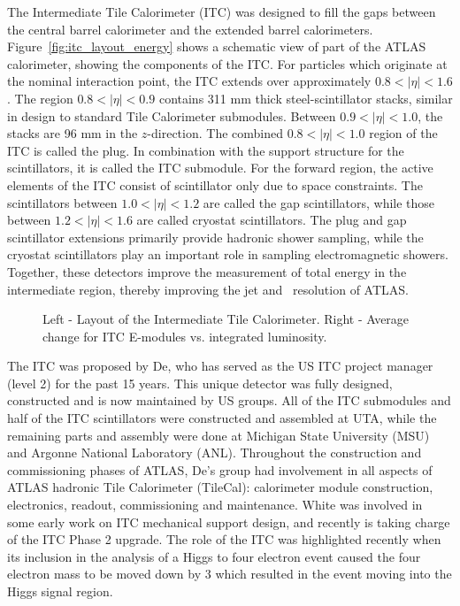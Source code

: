 
The Intermediate Tile Calorimeter (ITC) was designed to fill the
gaps between the central barrel calorimeter and the extended
barrel calorimeters. Figure~\ref{fig:itc_layout_energy} shows a schematic
view of part of the ATLAS calorimeter, showing the
components of the ITC. For particles which originate at the
nominal interaction point, the ITC extends over approximately $0.8
< |\eta| < 1.6$. The region $0.8 < |\eta| < 0.9$ contains 311 mm
thick steel-scintillator stacks, similar in design to standard
Tile Calorimeter submodules. Between $0.9 < |\eta| < 1.0$, the
stacks are 96 mm in the $z$-direction. The combined $0.8 < |\eta|
< 1.0$ region of the ITC is called the plug. In combination with
the support structure for the scintillators, it is called the ITC
submodule. For the forward region, the active elements of the ITC
consist of scintillator only due to space constraints. The
scintillators between $1.0 < |\eta| < 1.2$ are called the gap
scintillators, while those between $1.2 < |\eta| < 1.6$ are called
cryostat scintillators. The plug and gap scintillator extensions
primarily provide hadronic shower sampling, while the cryostat
scintillators play an important role in sampling electromagnetic
showers. Together, these detectors improve the measurement of
total energy in the intermediate region, thereby improving the jet
and \met\ resolution of ATLAS.

\begin{figure}[htb]
\centering
{}
\quad
{}

\caption{Left - Layout of the Intermediate Tile Calorimeter. Right - Average change for ITC E-modules vs. integrated luminosity.}
\end{figure} 

The ITC was proposed by De, who has served as the US ITC project manager (level 2) for the past 15 years. This unique detector was fully designed, constructed and is now maintained by US groups. 
All of the ITC submodules and half of the ITC scintillators were
constructed and assembled at UTA, while the remaining parts and assembly were done at Michigan State University (MSU) and Argonne National Laboratory (ANL). Throughout the construction and commissioning phases of ATLAS, De's group had involvement in all aspects of ATLAS hadronic Tile Calorimeter (TileCal): calorimeter module construction, electronics, readout, commissioning and maintenance. White was involved in some early work on ITC mechanical support design, and recently is taking charge of the ITC Phase 2 upgrade. The role of the ITC was highlighted recently when its inclusion in the analysis of a Higgs to
four electron event caused the four electron mass to be moved down by 3 \GeV
which resulted in the event moving into the Higgs signal region.

